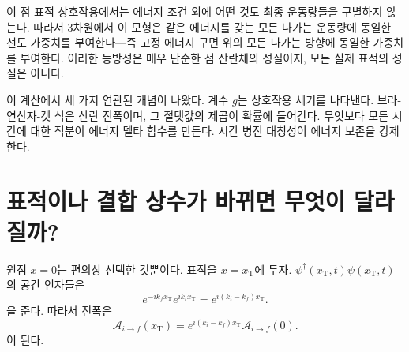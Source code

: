 \begin{classroomqa}
\end{classroomqa}


이 점 표적 상호작용에서는 에너지 조건 외에 어떤 것도 최종 운동량들을 구별하지 않는다. 따라서 3차원에서 이 모형은 같은 에너지를 갖는 모든 나가는 운동량에 동일한 선도 가중치를 부여한다---즉 고정 에너지 구면 위의 모든 나가는 방향에 동일한 가중치를 부여한다. 이러한 등방성은 매우 단순한 점 산란체의 성질이지, 모든 실제 표적의 성질은 아니다.

이 계산에서 세 가지 연관된 개념이 나왔다. 계수 \(g\)는 상호작용 세기를 나타낸다. 브라-연산자-켓 식은 산란 진폭이며, 그 절댓값의 제곱이 확률에 들어간다. 무엇보다 모든 시간에 대한 적분이 에너지 델타 함수를 만든다. 시간 병진 대칭성이 에너지 보존을 강제한다.

\section{표적이나 결합 상수가 바뀌면 무엇이 달라질까?}

원점 \(x=0\)는 편의상 선택한 것뿐이다. 표적을 \(x=x_{\mathrm T}\)에 두자. \(\psi^\dagger(x_{\mathrm T},t)\psi(x_{\mathrm T},t)\)의 공간 인자들은
\begin{equation}
e^{-ik_f x_{\mathrm T}}e^{ik_i x_{\mathrm T}}
=e^{i(k_i-k_f)x_{\mathrm T}}.
\end{equation}
을 준다. 따라서 진폭은
\begin{equation}
\mathcal A_{i\to f}(x_{\mathrm T})
=e^{i(k_i-k_f)x_{\mathrm T}}
\mathcal A_{i\to f}(0).
\end{equation}
이 된다.

\begin{classroomqa}
\end{classroomqa}

